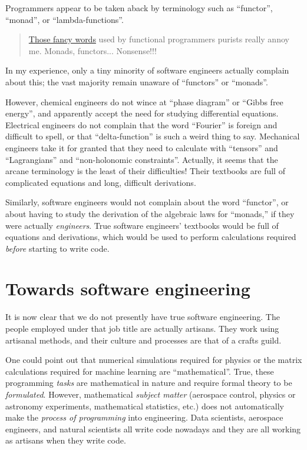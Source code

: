 Programmers appear to be taken aback by terminology such as ``functor'',
``monad'', or ``lambda-functions''.
\begin{quotation}
\href{https://www.cakesolutions.net/teamblogs/those-fancy-words-monads-functors-nonsense}{Those fancy words}
used by functional programmers purists really annoy me. Monads, functors...
Nonsense!!! 
\end{quotation}
In my experience, only a tiny minority of software engineers actually
complain about this; the vast majority remain unaware of ``functors''
or ``monads''.

However, chemical engineers do not wince at ``phase diagram'' or
``Gibbs free energy'', and apparently accept the need for studying
differential equations. Electrical engineers do not complain that
the word ``Fourier'' is foreign and difficult to spell, or that
``delta-function'' is such a weird thing to say. Mechanical engineers
take it for granted that they need to calculate with ``tensors''
and ``Lagrangians'' and ``non-holonomic constraints''. Actually,
it seems that the arcane terminology is the least of their difficulties!
Their textbooks are full of complicated equations and long, difficult
derivations.

Similarly, software engineers would not complain about the word ``functor'',
or about having to study the derivation of the algebraic laws for
``monads,'' \textendash{} if they were actually \emph{engineers}.
True software engineers' textbooks would be full of equations and
derivations, which would be used to perform calculations required
\emph{before} starting to write code.

\section{Towards software engineering }

It is now clear that we do not presently have true software engineering.
The people employed under that job title are actually artisans. They
work using artisanal methods, and their culture and processes are
that of a crafts guild.

One could point out that numerical simulations required for physics
or the matrix calculations required for machine learning are ``mathematical''.
True, these programming \emph{tasks} are mathematical in nature and
require formal theory to be \emph{formulated}. However, mathematical
\emph{subject matter} (aerospace control, physics or astronomy experiments,
mathematical statistics, etc.) does not automatically make the \emph{process
of programming} into engineering. Data scientists, aerospace engineers,
and natural scientists all write code nowadays \textendash{} and they
are all working as artisans when they write code.

